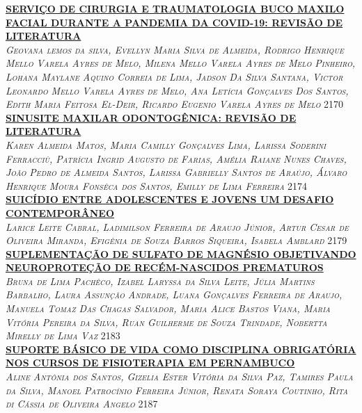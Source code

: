 \noindent \textsc{\hyperlink{trabalhos/251753.pdf.1}{\textbf{SERVIÇO DE CIRURGIA E TRAUMATOLOGIA BUCO MAXILO FACIAL DURANTE A PANDEMIA DA COVID-19: REVISÃO DE LITERATURA }}}\\ 
\noindent \textsc{\textit{Geovana lemos da silva, Evellyn Maria Silva de Almeida, Rodrigo Henrique Mello Varela Ayres de Melo, Milena Mello Varela Ayres de Melo Pinheiro, Lohana Maylane Aquino Correia de Lima, Jadson Da Silva Santana, Victor Leonardo Mello Varela Ayres de Melo, Ana Letícia Gonçalves Dos Santos, Edith Maria Feitosa El-Deir, Ricardo Eugenio Varela Ayres de Melo}} \hfill 2170\\ 

\noindent \textsc{\hyperlink{trabalhos/251087.pdf.1}{\textbf{SINUSITE MAXILAR ODONTOGÊNICA: REVISÃO DE LITERATURA}}}\\ 
\noindent \textsc{\textit{Karen Almeida Matos, Maria Camilly Gonçalves Lima, Larissa Soderini Ferracciù, Patrícia Ingrid Augusto de Farias, Amélia Raiane Nunes Chaves, João Pedro de Almeida Santos, Larissa Gabrielly Santos de Araújo, Álvaro Henrique Moura Fonsêca dos Santos, Emilly de Lima Ferreira}} \hfill 2174\\ 

\noindent \textsc{\hyperlink{trabalhos/248002.pdf.1}{\textbf{SUICÍDIO ENTRE ADOLESCENTES E JOVENS  UM DESAFIO CONTEMPORÂNEO}}}\\ 
\noindent \textsc{\textit{Larice Leite Cabral, Ladimilson Ferreira de Araujo Júnior, Artur Cesar de Oliveira Miranda, Efigênia de Souza Barros Siqueira, Isabela Amblard}} \hfill 2179\\ 

\noindent \textsc{\hyperlink{trabalhos/251641.pdf.1}{\textbf{SUPLEMENTAÇÃO DE SULFATO DE MAGNÉSIO OBJETIVANDO NEUROPROTEÇÃO DE RECÉM-NASCIDOS PREMATUROS}}}\\ 
\noindent \textsc{\textit{Bruna de Lima Pachêco, Izabel Laryssa da Silva Leite, Júlia Martins Barbalho, Laura Assunção Andrade, Luana Gonçalves Ferreira de Araujo, Manuela Tomaz Das Chagas Salvador, Maria Alice Bastos Viana, Maria Vitória Pereira da Silva, Ruan Guilherme de Souza Trindade, Nobertta Mirelly de Lima Vaz}} \hfill 2183\\ 

\noindent \textsc{\hyperlink{trabalhos/243948.pdf.1}{\textbf{SUPORTE BÁSICO DE VIDA COMO DISCIPLINA OBRIGATÓRIA NOS CURSOS DE FISIOTERAPIA EM PERNAMBUCO}}}\\ 
\noindent \textsc{\textit{Aline Antônia dos Santos, Gizelia Ester Vitória da Silva Paz, Tamires Paula da Silva, Manoel Patrocínio Ferreira Júnior, Renata Soraya Coutinho, Rita di Cássia de Oliveira Angelo}} \hfill 2187\\ 

